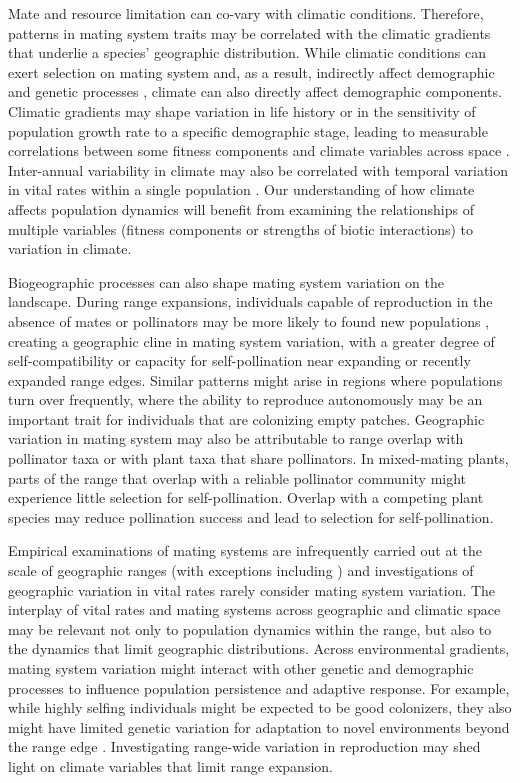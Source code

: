 \documentclass{article}
\begin{document}
Mate and resource limitation can co-vary with climatic conditions. Therefore, patterns in mating system traits may be correlated with the climatic gradients that underlie a species' geographic distribution. While climatic conditions can exert selection on mating system and, as a result, indirectly affect demographic \citep{lennartsson2002extinction, moeller2005ecologicalcontext} and genetic processes \citep{eckert2010plant, kramer2011influences}, climate can also directly affect demographic components. Climatic gradients may shape variation in life history or in the sensitivity of population growth rate to a specific demographic stage, leading to measurable correlations between some fitness components and climate variables across space \citep{doak2010demographic}. Inter-annual variability in climate may also be correlated with temporal variation in vital rates within a single population \citep{coulson2001age}. Our understanding of how climate affects population dynamics will benefit from examining the relationships of multiple variables (fitness components or strengths of biotic interactions) to variation in climate.

Biogeographic processes can also shape mating system variation on the landscape. During range expansions, individuals capable of reproduction in the absence of mates or pollinators may be more likely to found new populations \citep{baker1955self, pannell2015scope}, creating a geographic cline in mating system variation, with a greater degree of self-compatibility or capacity for self-pollination near expanding or recently expanded range edges. Similar patterns might arise in regions where populations turn over frequently, where the ability to reproduce autonomously may be an important trait for individuals that are colonizing empty patches. Geographic variation in mating system may also be attributable to range overlap with pollinator taxa or with plant taxa that share pollinators. In mixed-mating plants, parts of the range that overlap with a reliable pollinator community might experience little selection for self-pollination. Overlap with a competing plant species may reduce pollination success and lead to selection for self-pollination.

Empirical examinations of mating systems are infrequently carried out at the scale of geographic ranges (with exceptions including \citealt{busch2005evolution, herlihy2005evolution, moeller2005ecologicalcontext, dart2011broad, mimura2007adaptive}) and investigations of geographic variation in vital rates rarely consider mating system variation. The interplay of vital rates and mating systems across geographic and climatic space may be relevant not only to population dynamics within the range, but also to the dynamics that limit geographic distributions. Across environmental gradients, mating system variation might interact with other genetic and demographic processes to influence population persistence and adaptive response. For example, while highly selfing individuals might be expected to be good colonizers, they also might have limited genetic variation for adaptation to novel environments beyond the range edge \citep{wright2013evolutionary}. Investigating range-wide variation in reproduction may shed light on climate variables that limit range expansion.
\end{document}
